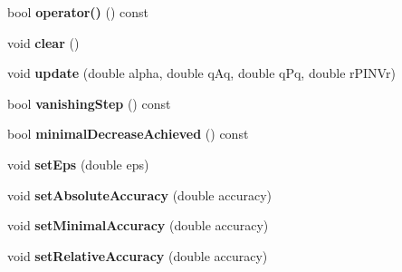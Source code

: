 \begin{DoxyCompactItemize}
\item 
\hypertarget{classSpacy_1_1CG_1_1TerminationCriterion_ab109eb287dd3622db54bbbdf0a55660a}{bool {\bfseries operator()} () const }\label{classSpacy_1_1CG_1_1TerminationCriterion_ab109eb287dd3622db54bbbdf0a55660a}

\item 
\hypertarget{classSpacy_1_1CG_1_1TerminationCriterion_a347651c14a38ce3bf1c92454aded97ab}{void {\bfseries clear} ()}\label{classSpacy_1_1CG_1_1TerminationCriterion_a347651c14a38ce3bf1c92454aded97ab}

\item 
\hypertarget{classSpacy_1_1CG_1_1TerminationCriterion_a4ef7ad43f594bab9b21f60e36697c516}{void {\bfseries update} (double alpha, double q\-Aq, double q\-Pq, double r\-P\-I\-N\-Vr)}\label{classSpacy_1_1CG_1_1TerminationCriterion_a4ef7ad43f594bab9b21f60e36697c516}

\item 
\hypertarget{classSpacy_1_1CG_1_1TerminationCriterion_ab92b8e27edb8290ed34c34a242f900d3}{bool {\bfseries vanishing\-Step} () const }\label{classSpacy_1_1CG_1_1TerminationCriterion_ab92b8e27edb8290ed34c34a242f900d3}

\item 
\hypertarget{classSpacy_1_1CG_1_1TerminationCriterion_a928da2a9183b773ca90477057b3d2b8b}{bool {\bfseries minimal\-Decrease\-Achieved} () const }\label{classSpacy_1_1CG_1_1TerminationCriterion_a928da2a9183b773ca90477057b3d2b8b}

\item 
\hypertarget{classSpacy_1_1CG_1_1TerminationCriterion_a59099ba9af213a66a33bb5b7c7061e11}{void {\bfseries set\-Eps} (double eps)}\label{classSpacy_1_1CG_1_1TerminationCriterion_a59099ba9af213a66a33bb5b7c7061e11}

\item 
\hypertarget{classSpacy_1_1CG_1_1TerminationCriterion_a833711290bf75d7cf7450f163f537510}{void {\bfseries set\-Absolute\-Accuracy} (double accuracy)}\label{classSpacy_1_1CG_1_1TerminationCriterion_a833711290bf75d7cf7450f163f537510}

\item 
\hypertarget{classSpacy_1_1CG_1_1TerminationCriterion_a5e16822944d08001fde24212857f4b2a}{void {\bfseries set\-Minimal\-Accuracy} (double accuracy)}\label{classSpacy_1_1CG_1_1TerminationCriterion_a5e16822944d08001fde24212857f4b2a}

\item 
\hypertarget{classSpacy_1_1CG_1_1TerminationCriterion_acea2a40d3f62813a3daa69ebbe8f2d16}{void {\bfseries set\-Relative\-Accuracy} (double accuracy)}\label{classSpacy_1_1CG_1_1TerminationCriterion_acea2a40d3f62813a3daa69ebbe8f2d16}


\end{DoxyCompactItemize}

